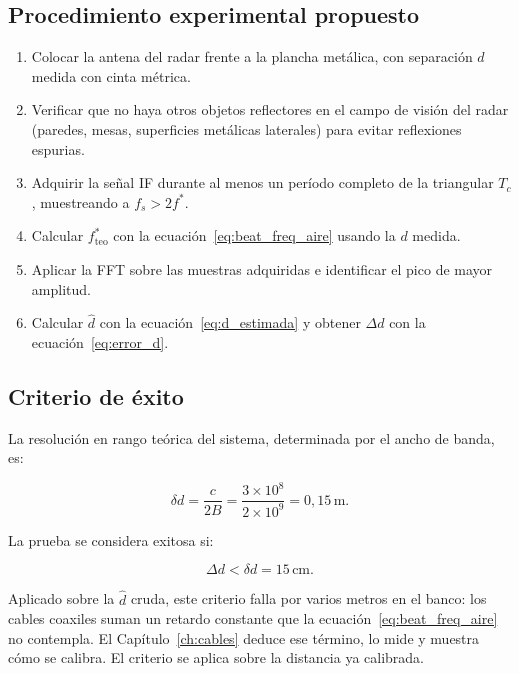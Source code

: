 \documentclass[12pt, a4paper, twoside]{report}
\begin{document}
\subsection{Procedimiento experimental propuesto}

\begin{enumerate}
  \item Colocar la antena del radar frente a la plancha metálica,
    con separación $d$ medida con cinta métrica.
  \item Verificar que no haya otros objetos reflectores en el campo
    de visión del radar (paredes, mesas, superficies metálicas
    laterales) para evitar reflexiones espurias.
  \item Adquirir la señal IF durante al menos un período completo de la
    triangular $T_c$, muestreando a $f_s > 2f^*$.
  \item Calcular $f^*_\text{teo}$ con la
    ecuación~\eqref{eq:beat_freq_aire} usando la $d$ medida.
  \item Aplicar la FFT sobre las muestras adquiridas e identificar
    el pico de mayor amplitud.
  \item Calcular $\hat{d}$ con la ecuación~\eqref{eq:d_estimada} y
    obtener $\Delta d$ con la ecuación~\eqref{eq:error_d}.
\end{enumerate}

\subsection{Criterio de éxito}

La resolución en rango teórica del sistema, determinada por el ancho
de banda, es:

\begin{equation}
  \delta d = \frac{c}{2B} = \frac{3\times10^8}{2\times10^9} = 0{,}15\,\text{m}.
  \label{eq:resolucion_rango}
\end{equation}

La prueba se considera exitosa si:

\begin{equation}
  \Delta d < \delta d = 15\,\text{cm}.
  \label{eq:criterio}
\end{equation}

Aplicado sobre la $\hat d$ cruda, este criterio falla por varios metros
en el banco: los cables coaxiles suman un retardo constante que la
ecuación~\eqref{eq:beat_freq_aire} no contempla. El
Capítulo~\ref{ch:cables} deduce ese término, lo mide y muestra cómo se
calibra. El criterio se aplica sobre la distancia ya calibrada.
\end{document}
